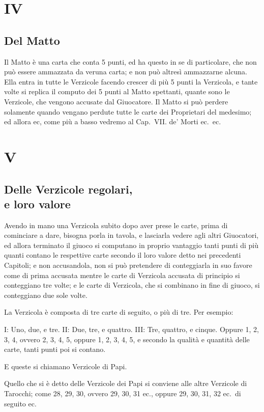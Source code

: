 \documentclass[11pt,a6paper]{article}
\begin{document}
\section{IV}
\subsection*{Del Matto}

Il Matto è una carta che conta 5 punti, ed ha questo in se di particolare, che non può essere ammazzata da veruna carta; e non può altresì ammazzarne alcuna. Ella entra in tutte le Verzicole facendo crescer di più 5 punti la Verzicola, e tante volte si replica il computo dei 5 punti al Matto spettanti, quante sono le Verzicole, che vengono accusate dal Giuocatore. Il Matto si può perdere solamente quando vengano perdute tutte le carte dei Proprietari del medesimo; ed allora ec, come più a basso vedremo al Cap.\ VII. de' Morti ec.\ ec.
\section{V}
\subsection{Delle Verzicole regolari,\\ e loro valore}

Avendo in mano una Verzicola subito dopo aver prese le carte, prima di cominciare a dare, bisogna porla in tavola, e lasciarla vedere agli altri Giuocatori, ed allora terminato il giuoco si computano in proprio vantaggio tanti punti di più quanti contano le respettive carte secondo il loro valore detto nei precedenti Capitoli; e non accusandola, non si può pretendere di conteggiarla in suo favore come di prima accusata mentre le carte di
Verzicola accusata di principio si conteggiano tre volte; e le carte di Verzicola, che si combinano in fine di giuoco, si conteggiano due sole volte.

La Verzicola è composta di tre carte di seguito, o più di tre. Per esempio:

I: Uno, due, e tre. II: Due, tre, e quattro. III: Tre, quattro, e cinque. Oppure 1, 2, 3, 4, ovvero 2, 3, 4, 5, oppure 1, 2, 3, 4, 5, e secondo la qualità e quantità delle carte, tanti punti poi si contano.

E queste si chiamano Verzicole di Papi.

Quello che si è detto delle Verzicole dei Papi si conviene alle altre Verzicole di Tarocchi; come 28, 29, 30, ovvero 29, 30, 31 ec., oppure 29, 30, 31, 32 ec.\ di seguito ec.
\end{document}
